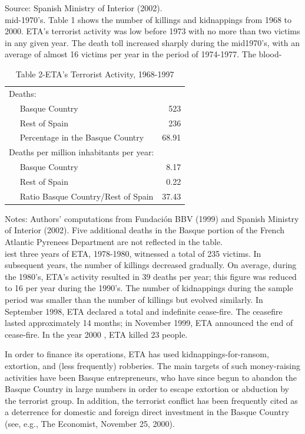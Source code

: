 \documentclass[10pt]{article}
\begin{document}
Source: Spanish Ministry of Interior (2002).\\
mid-1970's. Table 1 shows the number of killings and kidnappings from 1968 to 2000. ETA's terrorist activity was low before 1973 with no more than two victims in any given year. The death toll increased sharply during the mid1970's, with an average of almost 16 victims per year in the period of 1974-1977. The blood-

\begin{table}[h]
\begin{center}
\captionsetup{labelformat=empty}
\caption{Table 2-ETA's Terrorist Activity, 1968-1997}
\begin{tabular}{lr}
\hline\hline
Deaths: &  \\
$\quad$ Basque Country & 523 \\
$\quad$ Rest of Spain & 236 \\
$\quad$ Percentage in the Basque Country & 68.91 \\
Deaths per million inhabitants per year: &  \\
$\quad$ Basque Country & 8.17 \\
$\quad$ Rest of Spain & 0.22 \\
$\quad$ Ratio Basque Country/Rest of Spain & 37.43 \\
\hline
\end{tabular}
\end{center}
\end{table}

Notes: Authors' computations from Fundación BBV (1999) and Spanish Ministry of Interior (2002). Five additional deaths in the Basque portion of the French Atlantic Pyrenees Department are not reflected in the table.\\
iest three years of ETA, 1978-1980, witnessed a total of 235 victims. In subsequent years, the number of killings decreased gradually. On average, during the 1980's, ETA's activity resulted in 39 deaths per year; this figure was reduced to 16 per year during the 1990's. The number of kidnappings during the sample period was smaller than the number of killings but evolved similarly. In September 1998, ETA declared a total and indefinite cease-fire. The ceasefire lasted approximately 14 months; in November 1999, ETA announced the end of cease-fire. In the year 2000 , ETA killed 23 people.

In order to finance its operations, ETA has used kidnappings-for-ransom, extortion, and (less frequently) robberies. The main targets of such money-raising activities have been Basque entrepreneurs, who have since begun to abandon the Basque Country in large numbers in order to escape extortion or abduction by the terrorist group. In addition, the terrorist conflict has been frequently cited as a deterrence for domestic and foreign direct investment in the Basque Country (see, e.g., The Economist, November 25, 2000).
\end{document}
